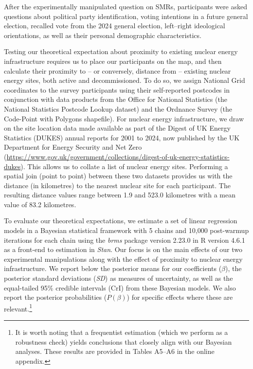 \documentclass[a4paper, 11pt]{article}
\begin{document}
After the experimentally manipulated question on SMRs, participants were asked questions about political party identification, voting intentions in a future general election, recalled vote from the 2024 general election, left--right ideological orientations, as well as their personal demographic characteristics.

Testing our theoretical expectation about proximity to existing nuclear energy infrastructure requires us to place our participants on the map, and then calculate their proximity to -- or conversely, distance from -- existing nuclear energy sites, both active and decommissioned. To do so, we assign National Grid coordinates to the survey participants using their self-reported postcodes in conjunction with data products from the Office for National Statistics (the National Statistics Postcode Lookup dataset) and the Ordnance Survey (the Code-Point with Polygons shapefile). For nuclear energy infrastructure, we draw on the site location data made available as part of the Digest of UK Energy Statistics (DUKES) annual reports for 2001 to 2024, now published by the UK Department for Energy Security and Net Zero (\url{https://www.gov.uk/government/collections/digest-of-uk-energy-statistics-dukes}). This allows us to collate a list of nuclear energy sites. Performing a spatial join (point to point) between these two datasets provides us with the distance (in kilometres) to the nearest nuclear site for each participant. The resulting distance values range between 1.9 and 523.0 kilometres with a mean value of 83.2 kilometres.

To evaluate our theoretical expectations, we estimate a set of linear regression models in a Bayesian statistical framework \citep{gill2024,kaplan2023} with 5 chains and 10,000 post-warmup iterations for each chain using the \emph{brms} package \citep{burkner2017} version 2.23.0 in R version 4.6.1 as a front-end to estimation in \emph{Stan}. Our focus is on the main effects of our two experimental manipulations along with the effect of proximity to nuclear energy infrastructure. We report below the posterior means for our coefficients ($\beta$), the posterior standard deviations (\emph{SD}) as measures of uncertainty, as well as the equal-tailed 95\% credible intervals (CrI) from these Bayesian models. We also report the posterior probabilities ($P(\beta)$) for specific effects where these are relevant.\footnote{It is worth noting that a frequentist estimation (which we perform as a robustness check) yields conclusions that closely align with our Bayesian analyses. These results are provided in Tables A5--A6 in the online appendix.}
\end{document}
